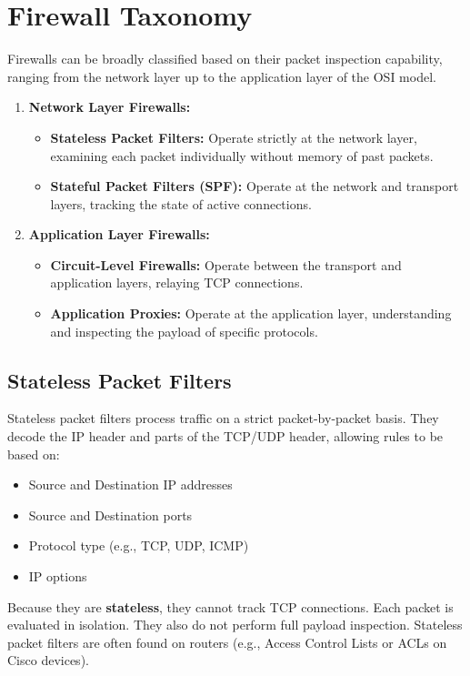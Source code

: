 \section{Firewall Taxonomy}

Firewalls can be broadly classified based on their packet inspection capability, ranging from the network layer up to the application layer of the OSI model.

\begin{enumerate}
    \item \textbf{Network Layer Firewalls:}
    \begin{itemize}
        \item \textbf{Stateless Packet Filters:} Operate strictly at the network layer, examining each packet individually without memory of past packets.
        \item \textbf{Stateful Packet Filters (SPF):} Operate at the network and transport layers, tracking the state of active connections.
    \end{itemize}
    \item \textbf{Application Layer Firewalls:}
    \begin{itemize}
        \item \textbf{Circuit-Level Firewalls:} Operate between the transport and application layers, relaying TCP connections.
        \item \textbf{Application Proxies:} Operate at the application layer, understanding and inspecting the payload of specific protocols.
    \end{itemize}
\end{enumerate}

\subsection{Stateless Packet Filters}

Stateless packet filters process traffic on a strict packet-by-packet basis. They decode the IP header and parts of the TCP/UDP header, allowing rules to be based on:
\begin{itemize}
    \item Source and Destination IP addresses
    \item Source and Destination ports
    \item Protocol type (e.g., TCP, UDP, ICMP)
    \item IP options
\end{itemize}

Because they are \textbf{stateless}, they cannot track TCP connections. Each packet is evaluated in isolation. They also do not perform full payload inspection. Stateless packet filters are often found on routers (e.g., Access Control Lists or ACLs on Cisco devices).

